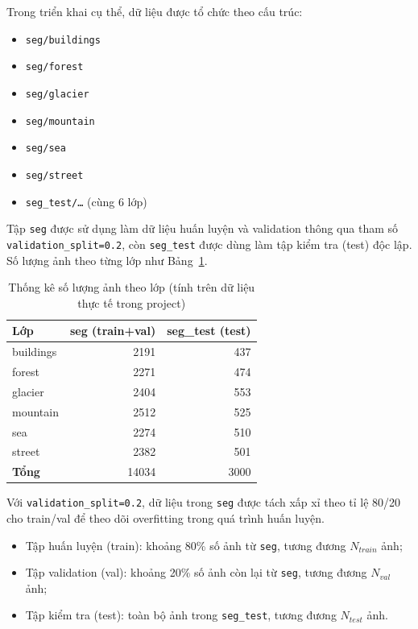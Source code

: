 \documentclass[12pt,a4paper]{article}
\begin{document}
Trong triển khai cụ thể, dữ liệu được tổ chức theo cấu trúc:
\begin{itemize}
    \item \texttt{seg/buildings}
    \item \texttt{seg/forest}
    \item \texttt{seg/glacier}
    \item \texttt{seg/mountain}
    \item \texttt{seg/sea}
    \item \texttt{seg/street}
    \item \texttt{seg\_test/\dots} (cùng 6 lớp)
\end{itemize}

Tập \texttt{seg} được sử dụng làm dữ liệu huấn luyện và validation thông qua tham số \texttt{validation\_split=0.2}, còn \texttt{seg\_test} được dùng làm tập kiểm tra (test) độc lập. Số lượng ảnh theo từng lớp như Bảng~\ref{tab:dataset-counts}.

\begin{table}[h]
\centering
\caption{Thống kê số lượng ảnh theo lớp (tính trên dữ liệu thực tế trong project)}
\label{tab:dataset-counts}
\begin{tabular}{lrr}
\toprule
\textbf{Lớp} & \textbf{seg (train+val)} & \textbf{seg\_test (test)}\\
\midrule
buildings & 2191 & 437\\
forest & 2271 & 474\\
glacier & 2404 & 553\\
mountain & 2512 & 525\\
sea & 2274 & 510\\
street & 2382 & 501\\
\midrule
\textbf{Tổng} & 14034 & 3000\\
\bottomrule
\end{tabular}
\end{table}

Với \texttt{validation\_split=0.2}, dữ liệu trong \texttt{seg} được tách xấp xỉ theo tỉ lệ 80/20 cho train/val để theo dõi overfitting trong quá trình huấn luyện.
\begin{itemize}
    \item Tập huấn luyện (train): khoảng 80\% số ảnh từ \texttt{seg}, tương đương $N_{train}$ ảnh;
    \item Tập validation (val): khoảng 20\% số ảnh còn lại từ \texttt{seg}, tương đương $N_{val}$ ảnh;
    \item Tập kiểm tra (test): toàn bộ ảnh trong \texttt{seg\_test}, tương đương $N_{test}$ ảnh.
\end{itemize}
\end{document}
